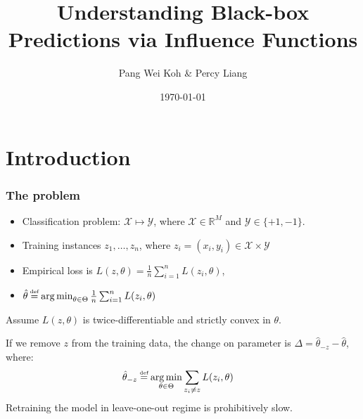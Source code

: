 \documentclass[UTF8]{beamer}
\title{Understanding Black-box Predictions via Influence Functions}
\author{Pang Wei Koh \& Percy Liang}
\date{\today}
\newcommand\myeq{\stackrel{\mathclap{\tiny\mbox{def}}}{=}}
\DeclareMathOperator*{\argmin}{arg\,min}
\begin{document}
\frame{\titlepage}

\section[Outline]{}
\frame{\tableofcontents}

\section{Introduction}
\frame{\tableofcontents[currentsection, sectionstyle=show/shaded]}
\begin{frame}
\frametitle{The problem}
\begin{itemize}
\item Classification problem: $\mathcal{X} \mapsto \mathcal{Y}$, where $\mathcal{X}\in\mathbb{R}^M$ and $\mathcal{Y}\in\{+1, -1\}$.\\
\item Training instances $z_1,\dots, z_n$, where $z_i = (x_i, y_i) \in \mathcal{X}\times\mathcal{Y}$\\
\item Empirical loss is $L(z, \theta) = \frac{1}{n}\sum_{i=1}^{n}L(z_i, \theta)$, 
\item $\hat{\theta} \myeq \argmin_{\theta\in\Theta}\frac{1}{n}\sum_{i=1}^nL(z_i, \theta)$
\end{itemize}
Assume $L(z, \theta)$ is twice-differentiable and strictly convex in $\theta$.

If we remove $z$ from the training data, the change on parameter is $\Delta = \hat{\theta}_{-z} - \hat{\theta}$, where:
\begin{align}
\hat{\theta}_{-z} &\myeq \argmin_{\theta\in\Theta}\sum_{z_i\neq z}L(z_i, \theta) \nonumber
\end{align}
Retraining the model in leave-one-out regime is prohibitively slow.
\end{frame}
\end{document}
